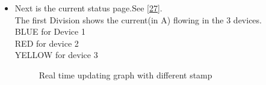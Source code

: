 \documentclass[a4paper,12pt,oneside]{book}
\begin{document}
\begin{itemize}
	\item{Next is the current status page.See \autoref{27}.\\ The first Division shows the current(in A) flowing in the 3 devices. \\BLUE for Device 1\\RED for device 2\\YELLOW for device 3 }
	
	\begin{figure}[!h]%
		\centering
		\qquad
		\caption{Real time updating graph with different stamp }%
		\label{27}%
	\end{figure}
	

\end{itemize}
\end{document}
